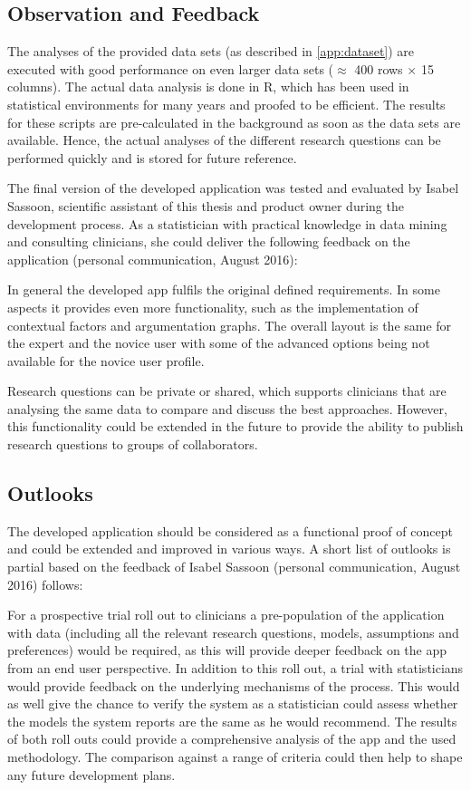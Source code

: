 \subsection{Observation and Feedback}
\sloppy

The analyses of the provided data sets (as described in \autoref{app:dataset}) are executed with good performance on even larger data sets ($\approx$ 400 rows $\times$ 15 columns). The actual data analysis is done in \gls{R}, which has been used in statistical environments for many years and proofed to be efficient. The results for these scripts are pre-calculated in the background as soon as the data sets are available. Hence, the actual analyses of the different research questions can be performed quickly and is stored for future reference.

The final version of the developed application was tested and evaluated by Isabel Sassoon, scientific assistant of this thesis and product owner during the development process. As a statistician with practical knowledge in data mining and consulting clinicians, she could deliver the following feedback on the application (personal communication, August 2016):

In general the developed app fulfils the original defined requirements. In some aspects it provides even more functionality, such as the implementation of contextual factors and argumentation graphs. The overall layout is the same for the expert and the novice user with some of the advanced options being not available for the novice user profile.

Research questions can be private or shared, which supports clinicians that are analysing the same data to compare and discuss the best approaches. However, this functionality could be extended in the future to provide the ability to publish research questions to groups of collaborators.


\subsection{Outlooks}
\label{sub:outlooks}

The developed application should be considered as a functional proof of concept and could be extended and improved in various ways. A short list of outlooks is partial based on the feedback of Isabel Sassoon (personal communication, August 2016) follows:

For a prospective trial roll out to clinicians a pre-population of the application with data (including  all the relevant research questions, models, assumptions and preferences) would be required, as this will provide deeper feedback on the app from an end user perspective. In addition to this roll out, a trial with statisticians would provide feedback on the underlying mechanisms of the process. This would as well give the chance to verify the system as a statistician could assess whether the models the system reports are the same as he would recommend. The results of both roll outs could provide a comprehensive analysis of the app and the used methodology. The comparison against a range of criteria could then help to shape any future development plans.

